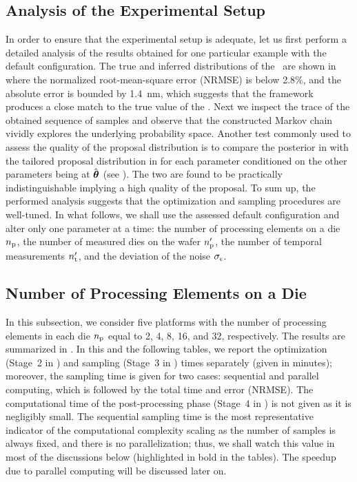 \subsection{Analysis of the Experimental Setup}
In order to ensure that the experimental setup is adequate, let us first perform a detailed analysis of the results obtained for one particular example with the default configuration.
The true and inferred distributions of the \qoi\ are shown in  where the normalized root-mean-square error (NRMSE) is below 2.8\%, and the absolute error is bounded by 1.4~nm, which suggests that the framework produces a close match to the true value of the \qoi.
Next we inspect the trace of the obtained sequence of samples and observe that the constructed Markov chain vividly explores the underlying probability space.
Another test commonly used to assess the quality of the proposal distribution is to compare the posterior in  with the tailored proposal distribution in  for each parameter conditioned on the other parameters being at $\hat{{\boldsymbol\theta}}$ (see ).
The two are found to be practically indistinguishable implying a high quality of the proposal.
To sum up, the performed analysis suggests that the optimization and sampling procedures are well-tuned.
In what follows, we shall use the assessed default configuration and alter only one parameter at a time: the number of processing elements on a die ${n_\text{p}}$, the number of measured dies on the wafer ${n_\text{p}'}$, the number of temporal measurements ${n_\text{t}'}$, and the deviation of the noise $\sigma_\epsilon$.

\subsection{Number of Processing Elements on a Die}
In this subsection, we consider five platforms with the number of processing elements in each die ${n_\text{p}}$ equal to 2, 4, 8, 16, and 32, respectively. The results are summarized in .
In this and the following tables, we report the optimization (Stage~2 in ) and sampling (Stage~3 in ) times separately (given in minutes); moreover, the sampling time is given for two cases: sequential and parallel computing, which is followed by the total time and error (NRMSE). The computational time of the post-processing phase (Stage~4 in ) is not given as it is negligibly small.
The sequential sampling time is the most representative indicator of the computational complexity scaling as the number of samples is always fixed, and there is no parallelization; thus, we shall watch this value in most of the discussions below (highlighted in bold in the tables). The speedup due to parallel computing will be discussed later on.

